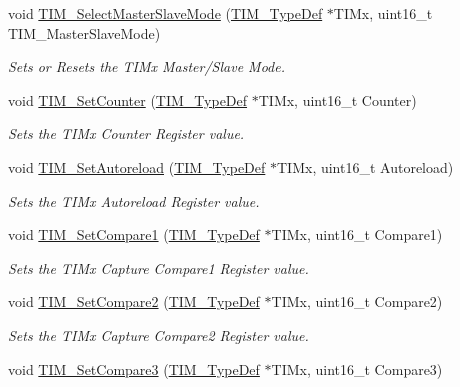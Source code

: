 \begin{DoxyCompactItemize}
void \mbox{\hyperlink{group___t_i_m___private___functions_ga4dcc3d11b670c381d0ff9cb7e9fd01e2}{T\+I\+M\+\_\+\+Select\+Master\+Slave\+Mode}} (\mbox{\hyperlink{struct_t_i_m___type_def}{T\+I\+M\+\_\+\+Type\+Def}} $\ast$T\+I\+Mx, uint16\+\_\+t T\+I\+M\+\_\+\+Master\+Slave\+Mode)
\begin{DoxyCompactList}\small\item\em Sets or Resets the T\+I\+Mx Master/\+Slave Mode. \end{DoxyCompactList}\item 
void \mbox{\hyperlink{group___t_i_m___private___functions_gaad2c31dc9c551b48f08b96ba49c4aa44}{T\+I\+M\+\_\+\+Set\+Counter}} (\mbox{\hyperlink{struct_t_i_m___type_def}{T\+I\+M\+\_\+\+Type\+Def}} $\ast$T\+I\+Mx, uint16\+\_\+t Counter)
\begin{DoxyCompactList}\small\item\em Sets the T\+I\+Mx Counter Register value. \end{DoxyCompactList}\item 
void \mbox{\hyperlink{group___t_i_m___private___functions_ga7880e4c00002d6421f9059a2ed841d5c}{T\+I\+M\+\_\+\+Set\+Autoreload}} (\mbox{\hyperlink{struct_t_i_m___type_def}{T\+I\+M\+\_\+\+Type\+Def}} $\ast$T\+I\+Mx, uint16\+\_\+t Autoreload)
\begin{DoxyCompactList}\small\item\em Sets the T\+I\+Mx Autoreload Register value. \end{DoxyCompactList}\item 
void \mbox{\hyperlink{group___t_i_m___private___functions_gab3a6031f187cb8af62eb09a67b4fd2ad}{T\+I\+M\+\_\+\+Set\+Compare1}} (\mbox{\hyperlink{struct_t_i_m___type_def}{T\+I\+M\+\_\+\+Type\+Def}} $\ast$T\+I\+Mx, uint16\+\_\+t Compare1)
\begin{DoxyCompactList}\small\item\em Sets the T\+I\+Mx Capture Compare1 Register value. \end{DoxyCompactList}\item 
void \mbox{\hyperlink{group___t_i_m___private___functions_ga0175ef4fabade443909002a63d4e9758}{T\+I\+M\+\_\+\+Set\+Compare2}} (\mbox{\hyperlink{struct_t_i_m___type_def}{T\+I\+M\+\_\+\+Type\+Def}} $\ast$T\+I\+Mx, uint16\+\_\+t Compare2)
\begin{DoxyCompactList}\small\item\em Sets the T\+I\+Mx Capture Compare2 Register value. \end{DoxyCompactList}\item 
void \mbox{\hyperlink{group___t_i_m___private___functions_ga416df50f4223351e366ae40a4ec163ae}{T\+I\+M\+\_\+\+Set\+Compare3}} (\mbox{\hyperlink{struct_t_i_m___type_def}{T\+I\+M\+\_\+\+Type\+Def}} $\ast$T\+I\+Mx, uint16\+\_\+t Compare3)

\end{DoxyCompactItemize}
